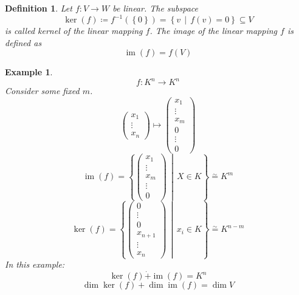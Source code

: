 \documentclass[a4paper,landscape,twocolumn]{article}
\newcommand\set[1]{\left\{#1\right\}}
\newcommand\setdef[2]{\left\{#1\,\middle|\,#2\right\}}
\newtheorem{defi}{Definition}
\newtheorem{ex}{Example}
\begin{document}
\begin{defi}
  Let $f: V \rightarrow W$ be linear.
  The subspace
  \[ \operatorname{ker}(f) \coloneqq f^{-1}(\set{0}) = \setdef{v}{f(v) = 0} \subseteq V \]
  is called \emph{kernel} of the linear mapping $f$.
  The \emph{image} of the linear mapping $f$ is defined as
  \[ \operatorname{im}(f) = f(V) \]
\end{defi}
%
\begin{ex}
  \[ f: K^n \rightarrow K^n \]
  Consider some fixed $m$.
  \[
    \begin{pmatrix} x_1 \\ \vdots \\ x_n \end{pmatrix}
    \mapsto
    \begin{pmatrix} x_1 \\ \vdots \\ x_m \\ 0 \\ \vdots \\ 0 \end{pmatrix}
  \]
  \[
    \operatorname{im}(f) = \setdef{\begin{pmatrix} x_1 \\ \vdots \\ x_m \\ \vdots \\ 0 \end{pmatrix}}{X \in K}
    \stackrel\sim=
    K^m
  \] \[
    \operatorname{ker}(f) = \setdef{\begin{pmatrix} 0 \\ \vdots \\ 0 \\ x_{n+1} \\ \vdots \\ x_n \end{pmatrix}}{x_i \in K}
    \stackrel\sim= K^{n-m}
  \]
  In this example:
  \[ \operatorname{ker}(f) \dot{+} \operatorname{im}(f) = K^n \]
  \[ \dim{\operatorname{ker}(f)} + \dim{\operatorname{im}(f)} = \dim{V} \]
\end{ex}
\end{document}
